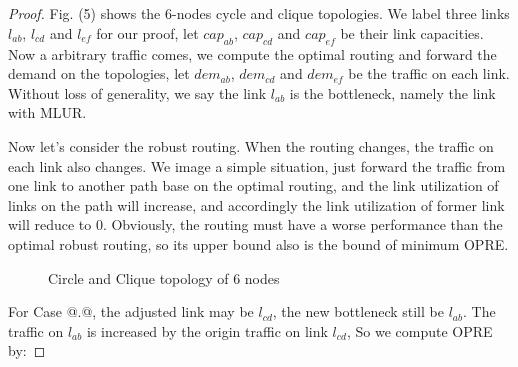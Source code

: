 \documentclass[conference]{IEEEtran}
\makeatletter
\newcommand{\Rmnum}[1]{\expandafter\@slowromancap\romannumeral #1@}
\makeatother
\begin{document}
\section{}
\begin{proof}
Fig. (5) shows the 6-nodes cycle and clique topologies. We label three links $l_{ab}$, $l_{cd}$ and $l_{ef}$
for our proof, let $cap_{ab}$, $cap_{cd}$ and $cap_{ef}$ be their link capacities. Now a arbitrary traffic
comes, we compute the optimal routing and forward the demand on the topologies, let $dem_{ab}$, $dem_{cd}$
and $dem_{ef}$ be the traffic on each link. Without loss of generality, we say the link $l_{ab}$ is the 
bottleneck, namely the link with MLUR. 


Now let's consider the robust routing. When the routing changes, the traffic on each link also changes.
We image a simple situation, just forward the traffic from one link to another path base on the optimal
routing, and the link utilization of links on the path will increase, and accordingly the link 
utilization of former link will reduce to 0. Obviously, the routing must have a worse performance than 
the optimal robust routing, so its upper bound also is the bound of minimum OPRE.


\begin{figure}[!t]
\centering
\vspace*{0.1in}
\hfill
{}
\caption{Circle and Clique topology of 6 nodes}
\vspace*{0.1in}
\end{figure}

For Case \Rmnum{1}.\Rmnum{1}, the adjusted link may be $l_{cd}$, the new bottleneck still be $l_{ab}$. 
The traffic on $l_{ab}$ is increased by the origin traffic on link $l_{cd}$, So we compute OPRE by:


\end{proof}
\end{document}
